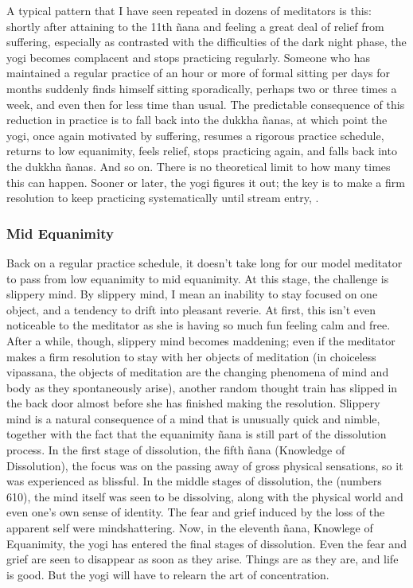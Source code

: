 \documentclass[a5paper,10pt,english]{book}
\begin{document}
\sphinxAtStartPar
A typical pattern that I have seen repeated in dozens of meditators is
this: shortly after attaining to the 11th ñana and feeling a great deal
of relief from suffering, especially as contrasted with the difficulties
of the dark night phase, the yogi becomes complacent and stops
practicing regularly. Someone who has maintained a regular practice of
an hour or more of formal sitting per days for months suddenly finds
himself sitting sporadically, perhaps two or three times a week, and
even then for less time than usual. The predictable consequence of this
reduction in practice is to fall back into the dukkha ñanas, at which
point the yogi, once again motivated by suffering, resumes a rigorous
practice schedule, returns to low equanimity, feels relief, stops
practicing again, and falls back into the dukkha ñanas. And so on. There
is no theoretical limit to how many times this can happen. Sooner or
later, the yogi figures it out; the key is to make a firm resolution to
keep practicing systematically until stream entry, .


\subsubsection{Mid Equanimity}
\label{\detokenize{main-2:mid-equanimity}}
\sphinxAtStartPar
Back on a regular practice schedule, it doesn’t take long for our model
meditator to pass from low equanimity to mid equanimity. At this stage,
the challenge is slippery mind. By slippery mind, I mean an inability to
stay focused on one object, and a tendency to drift into pleasant
reverie. At first, this isn’t even noticeable to the meditator as she is
having so much fun feeling calm and free. After a while, though,
slippery mind becomes maddening; even if the meditator makes a firm
resolution to stay with her objects of meditation (in choiceless
vipassana, the objects of meditation are the changing phenomena of mind
and body as they spontaneously arise), another random thought train has
slipped in the back door almost before she has finished making the
resolution. Slippery mind is a natural consequence of a mind that is
unusually quick and nimble, together with the fact that the equanimity
ñana is still part of the dissolution process. In the first stage of
dissolution, the fifth ñana (Knowledge of Dissolution), the focus was on
the passing away of gross physical sensations, so it was experienced as
blissful. In the middle stages of dissolution, the 
(numbers 6\sphinxhyphen{}10), the mind itself was seen to be dissolving, along with
the physical world and even one’s own sense of identity. The fear and
grief induced by the loss of the apparent self were mind\sphinxhyphen{}shattering.
Now, in the eleventh ñana, Knowlege of Equanimity, the yogi has entered
the final stages of dissolution. Even the fear and grief are seen to
disappear as soon as they arise. Things are as they are, and life is
good. But the yogi will have to relearn the art of concentration.
\end{document}
